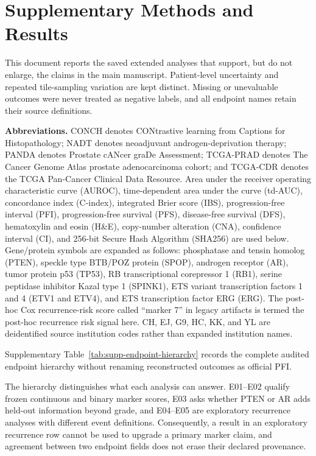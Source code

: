 \section*{Supplementary Methods and Results}

This document reports the saved extended analyses that support, but do not enlarge, the
claims in the main manuscript. Patient-level uncertainty and repeated tile-sampling
variation are kept distinct. Missing or unevaluable outcomes were never treated as negative
labels, and all endpoint names retain their source definitions.

\noindent\textbf{Abbreviations.} CONCH denotes CONtrastive learning from Captions for
Histopathology; NADT denotes neoadjuvant androgen-deprivation therapy; PANDA denotes
Prostate cANcer graDe Assessment; TCGA-PRAD denotes The Cancer Genome Atlas prostate
adenocarcinoma cohort; and TCGA-CDR denotes the TCGA Pan-Cancer Clinical Data Resource.
Area under the receiver operating characteristic curve (AUROC), time-dependent area under
the curve (td-AUC), concordance index (C-index), integrated Brier score (IBS),
progression-free interval (PFI), progression-free survival (PFS), disease-free survival
(DFS), hematoxylin and eosin (H\&E), copy-number alteration (CNA), confidence interval
(CI), and 256-bit Secure Hash Algorithm (SHA256) are used below. Gene/protein symbols are
expanded as follows: phosphatase and tensin
homolog (PTEN), speckle type BTB/POZ protein (SPOP), androgen receptor (AR), tumor protein
p53 (TP53), RB transcriptional corepressor 1 (RB1), serine peptidase inhibitor Kazal type 1
(SPINK1), ETS variant transcription factors 1 and 4 (ETV1 and ETV4), and ETS transcription
factor ERG (ERG). The post-hoc Cox recurrence-risk score called ``marker 7'' in legacy
artifacts is termed the post-hoc recurrence risk signal here.
CH, EJ, G9, HC, KK, and YL are deidentified source institution codes rather than expanded
institution names.

\noindent Supplementary Table~\ref{tab:supp-endpoint-hierarchy} records the complete
audited endpoint hierarchy without renaming reconstructed outcomes as official PFI.



The hierarchy distinguishes what each analysis can answer. E01--E02 qualify frozen
continuous and binary marker scores, E03 asks whether PTEN or AR adds held-out information
beyond grade, and E04--E05 are exploratory recurrence analyses with different event
definitions. Consequently, a result in an exploratory recurrence row cannot be used to
upgrade a primary marker claim, and agreement between two endpoint fields does not erase
their declared provenance.

